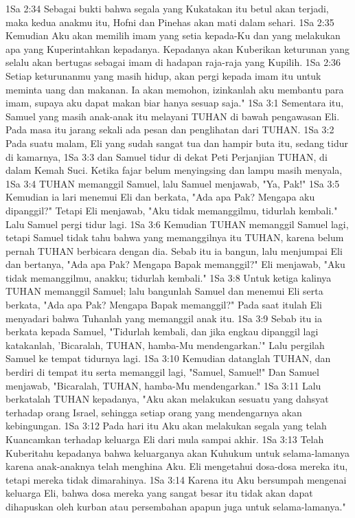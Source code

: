 1Sa 2:34  Sebagai bukti bahwa segala yang Kukatakan itu betul akan terjadi, maka kedua anakmu itu, Hofni dan Pinehas akan mati dalam sehari.
1Sa 2:35  Kemudian Aku akan memilih imam yang setia kepada-Ku dan yang melakukan apa yang Kuperintahkan kepadanya. Kepadanya akan Kuberikan keturunan yang selalu akan bertugas sebagai imam di hadapan raja-raja yang Kupilih.
1Sa 2:36  Setiap keturunanmu yang masih hidup, akan pergi kepada imam itu untuk meminta uang dan makanan. Ia akan memohon, izinkanlah aku membantu para imam, supaya aku dapat makan biar hanya sesuap saja."
1Sa 3:1  Sementara itu, Samuel yang masih anak-anak itu melayani TUHAN di bawah pengawasan Eli. Pada masa itu jarang sekali ada pesan dan penglihatan dari TUHAN.
1Sa 3:2  Pada suatu malam, Eli yang sudah sangat tua dan hampir buta itu, sedang tidur di kamarnya,
1Sa 3:3  dan Samuel tidur di dekat Peti Perjanjian TUHAN, di dalam Kemah Suci. Ketika fajar belum menyingsing dan lampu masih menyala,
1Sa 3:4  TUHAN memanggil Samuel, lalu Samuel menjawab, "Ya, Pak!"
1Sa 3:5  Kemudian ia lari menemui Eli dan berkata, "Ada apa Pak? Mengapa aku dipanggil?" Tetapi Eli menjawab, "Aku tidak memanggilmu, tidurlah kembali." Lalu Samuel pergi tidur lagi.
1Sa 3:6  Kemudian TUHAN memanggil Samuel lagi, tetapi Samuel tidak tahu bahwa yang memanggilnya itu TUHAN, karena belum pernah TUHAN berbicara dengan dia. Sebab itu ia bangun, lalu menjumpai Eli dan bertanya, "Ada apa Pak? Mengapa Bapak memanggil?" Eli menjawab, "Aku tidak memanggilmu, anakku; tidurlah kembali."
1Sa 3:8  Untuk ketiga kalinya TUHAN memanggil Samuel; lalu bangunlah Samuel dan menemui Eli serta berkata, "Ada apa Pak? Mengapa Bapak memanggil?" Pada saat itulah Eli menyadari bahwa Tuhanlah yang memanggil anak itu.
1Sa 3:9  Sebab itu ia berkata kepada Samuel, "Tidurlah kembali, dan jika engkau dipanggil lagi katakanlah, 'Bicaralah, TUHAN, hamba-Mu mendengarkan.'" Lalu pergilah Samuel ke tempat tidurnya lagi.
1Sa 3:10  Kemudian datanglah TUHAN, dan berdiri di tempat itu serta memanggil lagi, "Samuel, Samuel!" Dan Samuel menjawab, "Bicaralah, TUHAN, hamba-Mu mendengarkan."
1Sa 3:11  Lalu berkatalah TUHAN kepadanya, "Aku akan melakukan sesuatu yang dahsyat terhadap orang Israel, sehingga setiap orang yang mendengarnya akan kebingungan.
1Sa 3:12  Pada hari itu Aku akan melakukan segala yang telah Kuancamkan terhadap keluarga Eli dari mula sampai akhir.
1Sa 3:13  Telah Kuberitahu kepadanya bahwa keluarganya akan Kuhukum untuk selama-lamanya karena anak-anaknya telah menghina Aku. Eli mengetahui dosa-dosa mereka itu, tetapi mereka tidak dimarahinya.
1Sa 3:14  Karena itu Aku bersumpah mengenai keluarga Eli, bahwa dosa mereka yang sangat besar itu tidak akan dapat dihapuskan oleh kurban atau persembahan apapun juga untuk selama-lamanya."
